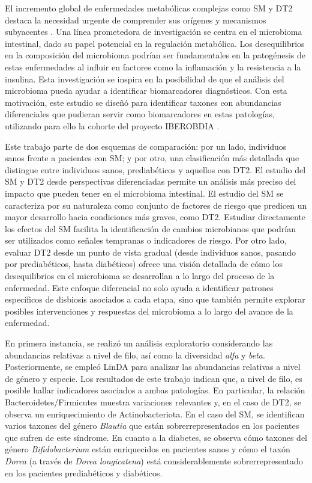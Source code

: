 El incremento global de enfermedades metabólicas complejas como SM y DT2 destaca la necesidad urgente de comprender sus orígenes y mecanismos subyacentes \cite{saklayen2018global, zimmet2016diabetes}. Una línea prometedora de investigación se centra en el microbioma intestinal, dado su papel potencial en la regulación metabólica. Los desequilibrios en la composición del microbioma podrían ser fundamentales en la patogénesis de estas enfermedades al influir en factores como la inflamación y la resistencia a la insulina. Esta investigación se inspira en la posibilidad de que el análisis del microbioma pueda ayudar a identificar biomarcadores diagnósticos. Con esta motivación, este estudio se diseñó para identificar taxones con abundancias diferenciales que pudieran servir como biomarcadores en estas patologías, utilizando para ello la cohorte del proyecto IBEROBDIA \cite{IBEROBDIA_project}.

Este trabajo parte de dos esquemas de comparación: por un lado, individuos sanos frente a pacientes con SM; y por otro, una clasificación más detallada que distingue entre individuos sanos, prediabéticos y aquellos con DT2. El estudio del SM y DT2 desde perspectivas diferenciadas permite un análisis más preciso del impacto que pueden tener en el microbioma intestinal. El estudio del SM se caracteriza por su naturaleza como conjunto de factores de riesgo que predicen un mayor desarrollo hacia condiciones más graves, como DT2. Estudiar directamente los efectos del SM facilita la identificación de cambios microbianos que podrían ser utilizados como señales tempranas o indicadores de riesgo. Por otro lado, evaluar DT2 desde un punto de vista gradual (desde individuos sanos, pasando por prediabéticos, hasta diabéticos) ofrece una visión detallada de cómo los desequilibrios en el microbioma se desarrollan a lo largo del proceso de la enfermedad. Este enfoque diferencial no solo ayuda a identificar patrones específicos de disbiosis asociados a cada etapa, sino que también permite explorar posibles intervenciones y respuestas del microbioma a lo largo del avance de la enfermedad.

En primera instancia, se realizó un análisis exploratorio considerando las abundancias relativas a nivel de filo, así como la diversidad \textit{alfa} y \textit{beta}. Posteriormente, se empleó LinDA \cite{zhou2022linda} para analizar las abundancias relativas a nivel de género y especie. Los resultados de este trabajo indican que, a nivel de filo, es posible hallar indicadores asociados a ambas patologías. En particular, la relación Bacteroidetes/Firmicutes muestra variaciones relevantes y, en el caso de DT2, se observa un enriquecimiento de Actinobacteriota. En el caso del SM, se identifican varios taxones del género \textit{Blautia} que están sobrerrepresentados en los pacientes que sufren de este síndrome. En cuanto a la diabetes, se observa cómo taxones del género \textit{Bifidobacterium} están enriquecidos en pacientes sanos y cómo el taxón \textit{Dorea} (a través de \textit{Dorea longicatena}) está considerablemente sobrerrepresentado en los pacientes prediabéticos y diabéticos.

